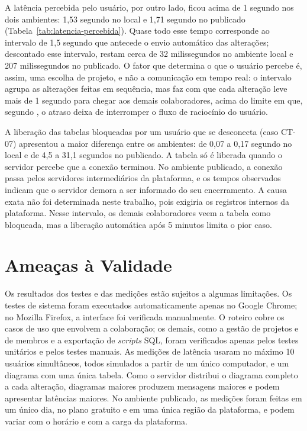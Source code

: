 A latência percebida pelo usuário, por outro lado, ficou acima de 1 segundo nos dois ambientes: 1,53 segundo no local e 1,71 segundo no publicado (Tabela~\ref{tab:latencia-percebida}). Quase todo esse tempo corresponde ao intervalo de 1,5 segundo que antecede o envio automático das alterações; descontado esse intervalo, restam cerca de 32 milissegundos no ambiente local e 207 milissegundos no publicado. O fator que determina o que o usuário percebe é, assim, uma escolha de projeto, e não a comunicação em tempo real: o intervalo agrupa as alterações feitas em sequência, mas faz com que cada alteração leve mais de 1 segundo para chegar aos demais colaboradores, acima do limite em que, segundo , o atraso deixa de interromper o fluxo de raciocínio do usuário.

A liberação das tabelas bloqueadas por um usuário que se desconecta (caso CT-07) apresentou a maior diferença entre os ambientes: de 0,07 a 0,17 segundo no local e de 4,5 a 31,1 segundos no publicado. A tabela só é liberada quando o servidor percebe que a conexão terminou. No ambiente publicado, a conexão passa pelos servidores intermediários da plataforma, e os tempos observados indicam que o servidor demora a ser informado do seu encerramento. A causa exata não foi determinada neste trabalho, pois exigiria os registros internos da plataforma. Nesse intervalo, os demais colaboradores veem a tabela como bloqueada, mas a liberação automática após 5 minutos limita o pior caso.

\section{Ameaças à Validade}

Os resultados dos testes e das medições estão sujeitos a algumas limitações. Os testes de sistema foram executados automaticamente apenas no Google Chrome; no Mozilla Firefox, a interface foi verificada manualmente. O roteiro cobre os casos de uso que envolvem a colaboração; os demais, como a gestão de projetos e de membros e a exportação de \textit{scripts} SQL, foram verificados apenas pelos testes unitários e pelos testes manuais. As medições de latência usaram no máximo 10 usuários simultâneos, todos simulados a partir de um único computador, e um diagrama com uma única tabela. Como o servidor distribui o diagrama completo a cada alteração, diagramas maiores produzem mensagens maiores e podem apresentar latências maiores. No ambiente publicado, as medições foram feitas em um único dia, no plano gratuito e em uma única região da plataforma, e podem variar com o horário e com a carga da plataforma.

